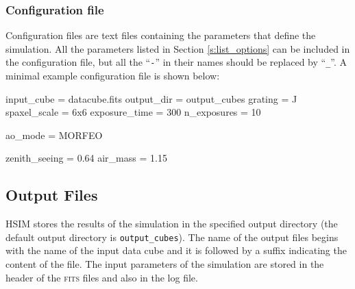 \documentclass[12pt]{report}
\begin{document}
\subsubsection{Configuration file}\label{ss:conf_file}

Configuration files are text files containing the parameters that define the simulation. All the parameters listed in Section \ref{s:list_options} can be included in the configuration file, but all the ``\texttt{-}'' in their names should be replaced by ``\texttt{\_}''. A minimal example configuration file is shown below:

\begin{textfile}
[HSIM]
input_cube = datacube.fits
output_dir = output_cubes
grating = J
spaxel_scale = 6x6
exposure_time = 300
n_exposures = 10

ao_mode = MORFEO

zenith_seeing = 0.64
air_mass = 1.15
\end{textfile}



\subsection{Output Files}\label{s:output}

HSIM stores the results of the simulation in the specified output directory (the default output directory is \texttt{output\_cubes}). The name of the output files begins with the name of the input data cube and it is followed by a suffix indicating the content of the file. The input parameters of the simulation are stored in the header of the \textsc{fits} files and also in the log file.
\end{document}
